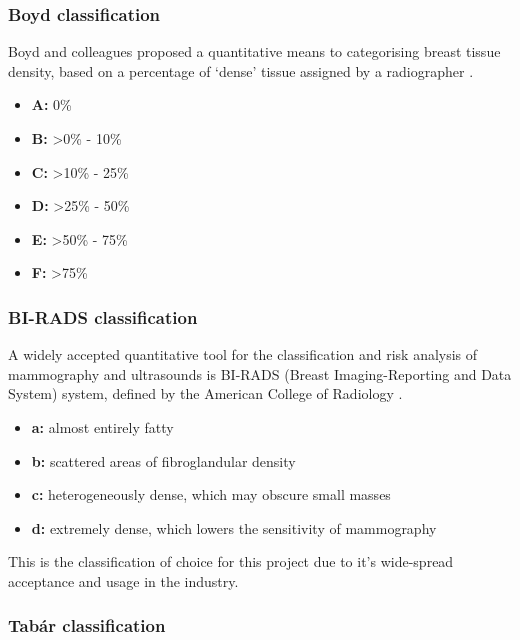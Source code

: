 \subsubsection{Boyd classification}

Boyd and colleagues proposed a quantitative means to categorising breast tissue density, based on a percentage of `dense' tissue assigned by a radiographer \cite{Boyd_Byng_Jong_Fishell_Little_Miller_Lockwood_Tritchler_Yaffe_1995}.

\begin{itemize}
  \item \textbf{A: } 0\%
  \item \textbf{B: } \textgreater 0\% - 10\%
  \item \textbf{C: } \textgreater 10\% - 25\%
  \item \textbf{D: } \textgreater 25\% - 50\%
  \item \textbf{E: } \textgreater 50\% - 75\%
  \item \textbf{F: } \textgreater 75\%
\end{itemize}

\subsubsection{BI-RADS classification}

A widely accepted quantitative tool for the classification and risk analysis of mammography and ultrasounds is BI-RADS (Breast Imaging-Reporting and Data System) system, defined by the American College of Radiology \cite{sickles2013acr}.

\begin{itemize}
  \item \textbf{a: } almost entirely fatty
  \item \textbf{b: } scattered areas of fibroglandular density
  \item \textbf{c: } heterogeneously dense, which may obscure small masses
  \item \textbf{d: } extremely dense, which lowers the sensitivity of mammography
\end{itemize}

This is the classification of choice for this project due to it's wide-spread acceptance and usage in the industry.

\subsubsection{Tab\'ar classification}

